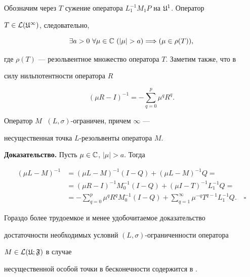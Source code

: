 Обозначим через $T$ сужение оператора $L_1^{-1}M_1P$ на $\frak U^1$. Оператор 


$T\in\cal L(\frak U^1)$, следовательно, 


$$ 


\exists a>0 \ \forall\mu\in\Bbb C \ (|\mu|>a) \Longrightarrow 


(\mu\in\rho(T)), 


$$ 


где $\rho(T)$ --- резольвентное множество оператора $T$. Заметим также, что в 


силу нильпотентности оператора $R$ 


$$ 


(\mu R-I)^{-1}=-\sum^p_{q=0}\mu^qR^q. 


$$ 


 




\begin{thms} Оператор $M\;$ $(L,\sigma)$-ограничен, причем $\infty$ --- 


несущественная точка $L$-резольвенты оператора $M$. 


\end{thms} 


\medskip 


 


{\bf Доказательство.} Пусть $\mu\in\Bbb C$, $|\mu|>a$. Тогда 


\begin{align*} 


(\mu L-M)^{-1} &= (\mu L-M)^{-1}(I-Q)+(\mu L-M)^{-1}Q= \\ 


&= (\mu R-I)^{-1}M_0^{-1}(I-Q)+(\mu I-T)^{-1}L_1^{-1}Q= \\ 


&= -\sum^p_{q=0}\mu^qR^qM_0^{-1}(I-Q) 


+\sum^\infty_{q=1}\mu^{-q}T^{q-1}L_1^{-1}Q.\quad \square 


\end{align*} 


 




\begin{notes} Гораздо более трудоемкое и менее удобочитаемое доказательство 


достаточности необходимых условий $(L,\sigma)$-ограниченности оператора 


$M\in\cal L(\frak U;\frak F)$ в случае 


несущественной особой точки в бесконечности содержится в \cite{S4}. 


\end{notes} 



